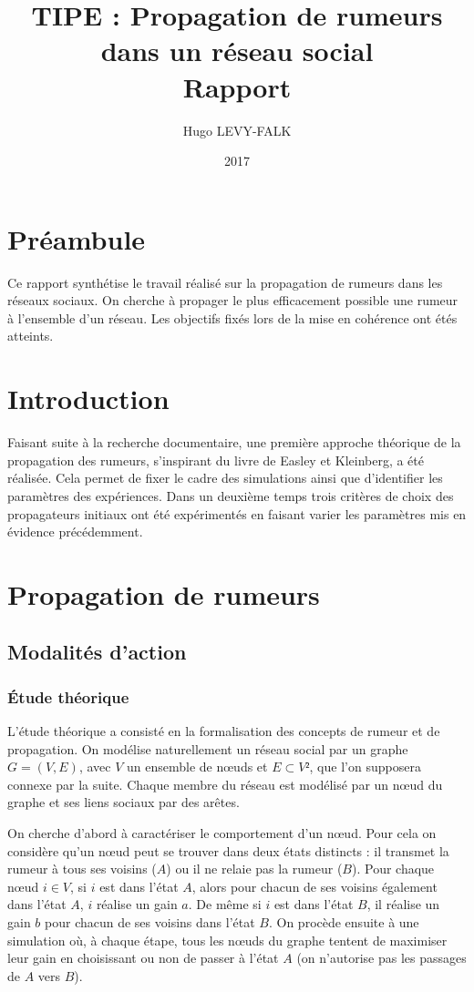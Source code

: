 \documentclass{article}
\title{TIPE : Propagation de rumeurs dans un réseau social\\Rapport}
\author{Hugo LEVY-FALK}
\date{2017}
\begin{document}
\maketitle
{}\;
\tableofcontents
\newpage

\section{Préambule}
Ce rapport synthétise le travail réalisé sur la propagation de rumeurs dans les réseaux sociaux. On cherche à propager le plus efficacement possible une rumeur à l'ensemble d'un réseau. Les objectifs fixés lors de la mise en cohérence ont étés atteints.

\section{Introduction}
Faisant suite à la recherche documentaire, une première approche théorique de la propagation des rumeurs, s'inspirant du livre de Easley et Kleinberg, a été réalisée. Cela permet de fixer le cadre des simulations ainsi que d'identifier les paramètres des expériences. Dans un deuxième temps trois critères de choix des propagateurs initiaux ont été expérimentés en faisant varier les paramètres mis en évidence précédemment.

\section{Propagation de rumeurs}
\subsection{Modalités d'action}
\subsubsection{Étude théorique}
L'étude théorique a consisté en la formalisation des concepts de rumeur et de propagation. On modélise naturellement un réseau social par un graphe $G = (V,E)$, avec $V$ un ensemble de nœuds et $E\subset V²$, que l'on supposera connexe par la suite. Chaque membre du réseau est modélisé par un nœud du graphe et ses liens sociaux par des arêtes.

On cherche d'abord à caractériser le comportement d'un nœud. Pour cela on considère qu'un nœud peut se trouver dans deux états distincts : il transmet la rumeur à tous ses voisins ($A$) ou il ne relaie pas la rumeur ($B$). Pour chaque nœud $i\in V$, si $i$ est dans l'état $A$, alors pour chacun de ses voisins également dans l'état $A$, $i$ réalise un gain $a$. De même si $i$ est dans l'état $B$, il réalise un gain $b$ pour chacun de ses voisins dans l'état $B$. On procède ensuite à une simulation où, à chaque étape, tous les nœuds du graphe tentent de maximiser leur gain en choisissant ou non de passer à l'état $A$ (on n'autorise pas les passages de $A$ vers $B$).
\end{document}
